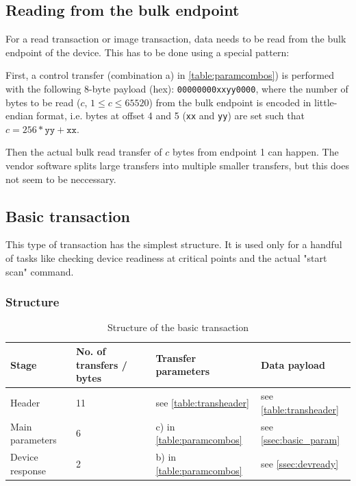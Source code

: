 \documentclass{article}
\begin{document}
\subsection{Reading from the bulk endpoint}
\label{ssec:bulkread}

For a read transaction or image transaction, data needs to be read from the bulk endpoint of the device.
This has to be done using a special pattern:

First, a control transfer (combination a) in \autoref{table:paramcombos}) is
performed with the following 8-byte payload (hex): {\tt 00000000xxyy0000},
where the number of bytes to be read ($c$, $1 \leq c \leq 65520$) from the bulk endpoint is encoded
in little-endian format, i.e. bytes at offset 4 and 5 ({\tt xx} and {\tt yy}) are set such that
$c = 256 * \texttt{yy} + \texttt{xx}$.

Then the actual bulk read transfer of $c$ bytes from endpoint 1 can happen. The vendor software
splits large transfers into multiple smaller transfers, but this does not seem
to be neccessary.

\subsection{Basic transaction}

This type of transaction has the simplest structure. It is used only for a handful of tasks like
checking device readiness at critical points and the actual "start scan" command.

\subsubsection{Structure}

\begin{table}[H]
  \caption{Structure of the basic transaction}
  \centering
  \begin{tabular}{p{3cm} | p{1.5cm} | p{3cm} | p{3cm}}
    Stage & No. of transfers / bytes & Transfer parameters & Data payload \\ \hline
    
    Header & 11 & see \autoref{table:transheader} & see \autoref{table:transheader} \\
    Main parameters & 6 & c) in \autoref{table:paramcombos} & see \ref{ssec:basic_param} \\
    Device response & 2 & b) in \autoref{table:paramcombos} & see \ref{ssec:devready} \\
  \end{tabular}
\end{table}
\end{document}
